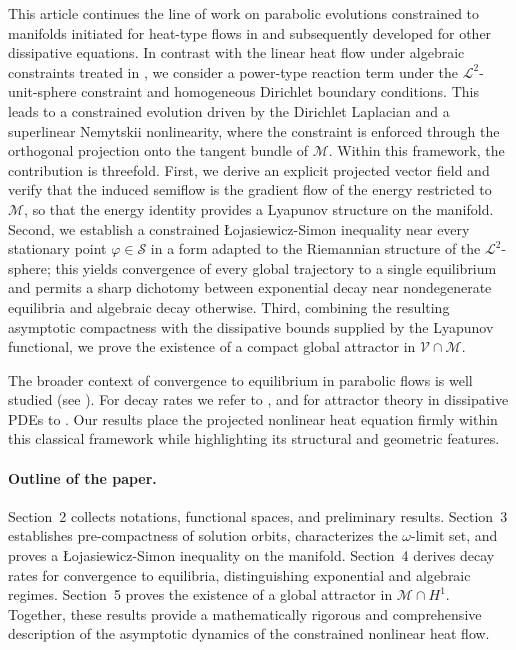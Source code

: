 \documentclass[reqno]{amsart}
\begin{document}
This article continues the line of work on parabolic evolutions constrained to manifolds
initiated for heat-type flows in \cite{Brz+Huss_2024,Cafe,Hussain_2005,Huss_2023,Rybka}
and subsequently developed for other dissipative equations. In contrast with the linear
heat flow under algebraic constraints treated in \cite{Cafe,Rybka}, we consider a
power-type reaction term under the $\mathcal{L}^{2}$-unit-sphere constraint and
homogeneous Dirichlet boundary conditions. This leads to a constrained evolution driven
by the Dirichlet Laplacian and a superlinear Nemytskii nonlinearity, where the constraint
is enforced through the orthogonal projection onto the tangent bundle of $\mathcal{M}$.
Within this framework, the contribution is threefold. First, we derive an explicit
projected vector field and verify that the induced semiflow is the gradient flow of the
energy restricted to $\mathcal{M}$, so that the energy identity provides a Lyapunov
structure on the manifold. Second, we establish a constrained \L{o}jasiewicz-Simon
inequality near every stationary point $\varphi\in\mathcal{S}$ in a form adapted to the
Riemannian structure of the $\mathcal{L}^{2}$-sphere; this yields convergence of
every global trajectory to a single equilibrium and permits a sharp dichotomy between
exponential decay near nondegenerate equilibria and algebraic decay otherwise.
Third, combining the resulting asymptotic compactness with the dissipative bounds
supplied by the Lyapunov functional, we prove the existence of a compact global
attractor in $\mathcal{V}\cap\mathcal{M}$.

The broader context of convergence to equilibrium in parabolic flows is well
studied (see \cite{BH_LDHilbert_2026,Brz+Huss_2020,Hale,Haraux,Haraux2011,
Haraux2009,Vishnevski,Lions,Matano,Simon}).
For decay rates we refer to \cite{Haraux2003,Songu}, and for attractor theory in
dissipative PDEs to \cite{Carvalho,Songu,Kapustyan,Temam}. Our results place the
projected nonlinear heat equation firmly within this classical framework while
highlighting its structural and geometric features.

\paragraph{Outline of the paper.}
Section~2 collects notations, functional spaces, and preliminary results.
Section~3 establishes pre-compactness of solution orbits, characterizes the
$\omega$-limit set, and proves a \L{o}jasiewicz-Simon inequality on the manifold.
Section~4 derives decay rates for convergence to equilibria, distinguishing
exponential and algebraic regimes. Section~5 proves the existence of a global
attractor in $\mathcal{M}\cap H^1$. Together, these results provide a mathematically
rigorous and comprehensive description of the asymptotic dynamics of the constrained
nonlinear heat flow.
\end{document}
